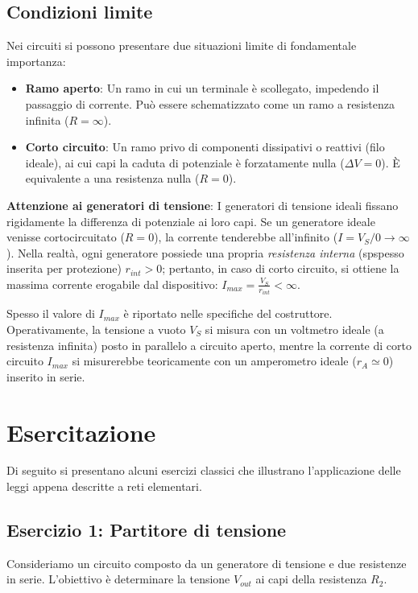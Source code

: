 \documentclass[11pt,a4paper]{report}
\begin{document}
\subsection*{Condizioni limite}
Nei circuiti si possono presentare due situazioni limite di fondamentale importanza:
\begin{itemize}[label=$\triangleright$]
    \item \textbf{Ramo aperto}: Un ramo in cui un terminale è scollegato, impedendo il passaggio di corrente. Può essere schematizzato come un ramo a resistenza infinita ($R=\infty$).
    \item \textbf{Corto circuito}: Un ramo privo di componenti dissipativi o reattivi (filo ideale), ai cui capi la caduta di potenziale è forzatamente nulla ($\Delta V=0$). È equivalente a una resistenza nulla ($R=0$).
\end{itemize}

\textbf{Attenzione ai generatori di tensione}: I generatori di tensione ideali fissano rigidamente la differenza di potenziale ai loro capi. Se un generatore ideale venisse cortocircuitato ($R=0$), la corrente tenderebbe all'infinito ($I = V_S / 0 \to \infty$). Nella realtà, ogni generatore possiede una propria \textit{resistenza interna} (spspesso inserita per protezione) $r_{int} > 0$; pertanto, in caso di corto circuito, si ottiene la massima corrente erogabile dal dispositivo: $I_{max} = \frac{V_S}{r_{int}} < \infty$.

Spesso il valore di $I_{max}$ è riportato nelle specifiche del costruttore. Operativamente, la tensione a vuoto $V_S$ si misura con un voltmetro ideale (a resistenza infinita) posto in parallelo a circuito aperto, mentre la corrente di corto circuito $I_{max}$ si misurerebbe teoricamente con un amperometro ideale ($r_A \simeq 0$) inserito in serie.

\section{Esercitazione}
Di seguito si presentano alcuni esercizi classici che illustrano l'applicazione delle leggi appena descritte a reti elementari.

\subsection*{Esercizio 1: Partitore di tensione}
Consideriamo un circuito composto da un generatore di tensione e due resistenze in serie. L'obiettivo è determinare la tensione $V_{out}$ ai capi della resistenza $R_2$.
\end{document}
